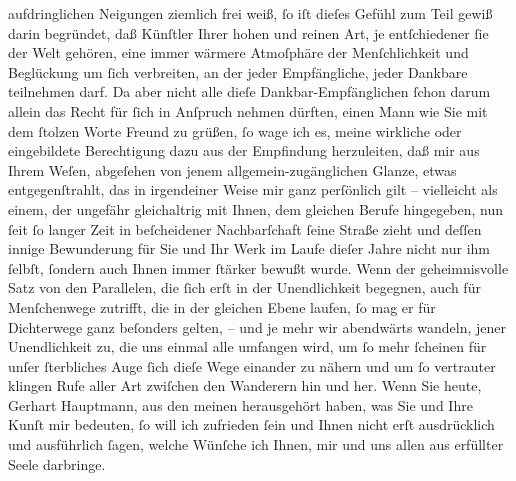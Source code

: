                aufdringlichen Neigungen ziemlich frei weiß,{ }ſo iſt dieſes Gefühl zum Teil gewiß
               darin begründet, daß Künſtler Ihrer hohen und reinen Art, je entſchiedener{ }ſie der
               Welt gehören, eine immer wärmere Atmoſphäre der Menſchlichkeit und Beglückung um{ }ſich
               verbreiten, an der jeder Empfängliche, jeder Dankbare teilnehmen darf. Da aber nicht
               alle dieſe Dankbar-Empfänglichen{ }ſchon darum allein das Recht für{ }ſich in Anſpruch
               nehmen dürften, einen Mann wie Sie mit dem{ }ſtolzen Worte Freund zu grüßen,{ }ſo wage
               ich es, meine wirkliche oder eingebildete Berechtigung dazu aus der Empfindung
               herzuleiten, daß mir aus Ihrem Weſen, abgeſehen von jenem allgemein-zugänglichen
               Glanze, etwas entgegenſtrahlt, das in irgendeiner Weise mir ganz perſönlich gilt –
               vielleicht als einem, der ungefähr gleichaltrig mit Ihnen, dem gleichen Berufe
               hingegeben, nun{ }ſeit{ }ſo langer Zeit in beſcheidener Nachbarſchaft{ }ſeine Straße zieht
               und deſſen innige Bewunderung für Sie und Ihr Werk im Laufe dieſer Jahre nicht nur
               ihm{ }ſelbſt,{ }ſondern auch Ihnen immer{ }ſtärker bewußt wurde. Wenn der geheimnisvolle
               Satz von den Parallelen, die{ }ſich erſt in der Unendlichkeit begegnen, auch für
               Menſchenwege zutrifft, die in der gleichen Ebene laufen,{ }ſo mag er für Dichterwege
               ganz beſonders gelten, – und je mehr wir abendwärts wandeln, jener Unendlichkeit zu,
               die uns einmal alle umfangen wird, um{ }ſo mehr{ }ſcheinen für unſer{ }ſterbliches Auge{ }ſich dieſe Wege einander zu nähern und um{ }ſo vertrauter klingen Rufe aller Art
               zwiſchen den Wanderern hin und her. Wenn Sie heute, Gerhart Hauptmann, aus den meinen
               herausgehört haben, was Sie und Ihre Kunſt mir bedeuten,{ }ſo will ich zufrieden{ }ſein
               und Ihnen nicht erſt ausdrücklich und ausführlich{ }ſagen, welche Wünſche ich Ihnen,
               mir und uns allen aus erfüllter Seele darbringe.\pend
           \endnumbering{}  \newcommand{\dateiname}{L02377}\newcommand{\titel}{Arthur Schnitzler an Gerhart Hauptmann, 17. 3. 1922}\newcommand{\editorInnen}{Herausgegeben von Martin Anton Müller}
